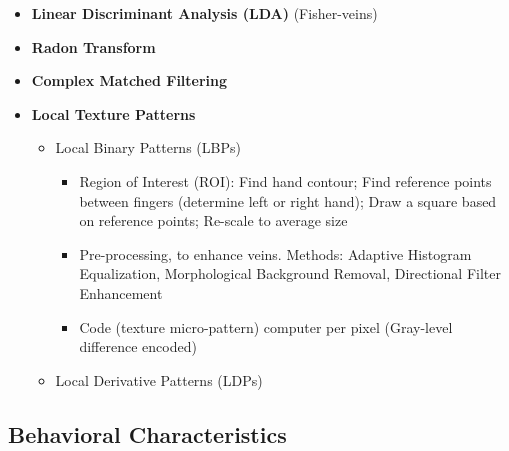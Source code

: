 \documentclass[a4paper]{article}
\begin{document}
\begin{itemize}
\begin{itemize}
          \item \textbf{Linear Discriminant Analysis (LDA)} (Fisher-veins)
          \item \textbf{Radon Transform}
          \item \textbf{Complex Matched Filtering}
          \item \textbf{Local Texture Patterns}
          \begin{itemize}
            \item Local Binary Patterns (LBPs)
            \begin{itemize}
              \item Region of Interest (ROI): Find hand contour; Find reference points between fingers (determine left or right hand); Draw a square based on reference points; Re-scale to average size
              \item Pre-processing, to enhance veins. Methods: Adaptive Histogram Equalization, Morphological Background Removal, Directional Filter Enhancement
              \item Code (texture micro-pattern) computer per pixel (Gray-level difference encoded)
            \end{itemize}
            \item Local Derivative Patterns (LDPs)
          \end{itemize}
        \end{itemize}
      \end{itemize}
      \newpage
  \subsection*{Behavioral Characteristics}
\end{document}
